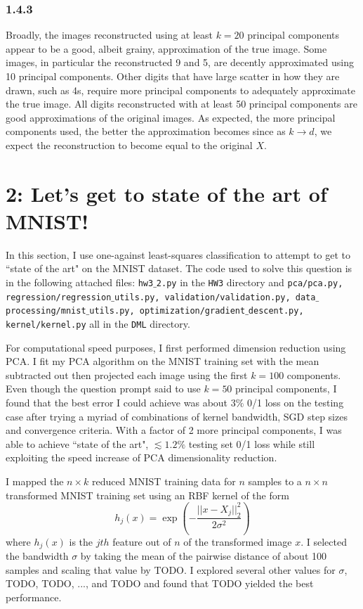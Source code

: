 \documentclass[12pt]{amsart}
\begin{document}
\subsubsection*{1.4.3}

Broadly, the images reconstructed using at least $k = 20$ principal components appear to be a good, albeit grainy, approximation of the true image.  Some images, in particular the reconstructed 9 and 5, are decently approximated using 10 principal components.  Other digits that have large scatter in how they are drawn, such as 4s, require more principal components to adequately approximate the true image.  All digits reconstructed with at least 50 principal components are good approximations of the original images.  As expected, the more principal components used, the better the approximation becomes since as $k \rightarrow d$, we expect the reconstruction to become equal to the original $X$.

\section*{2: Let's get to state of the art of MNIST!}

In this section, I use one-against least-squares classification to attempt to get to ``state of the art" on the MNIST dataset.  The code used to solve this question is in the following attached files: {\tt hw3$\_$2.py} in the {\tt HW3} directory and {\tt pca/pca.py, regression/regression$\_$utils.py, validation/validation.py, data$\_$processing/mnist$\_$utils.py, optimization/gradient$\_$descent.py, kernel/kernel.py} all in the {\tt DML} directory.

For computational speed purposes, I first performed dimension reduction using PCA.  I fit my PCA algorithm on the MNIST training set with the mean subtracted out then projected each image using the first $k = 100$ components.  Even though the question prompt said to use $k = 50$ principal components, I found that the best error I could achieve was about $3\%$ 0/1 loss on the testing case after trying a myriad of combinations of kernel bandwidth, SGD step sizes and convergence criteria.  With a factor of 2 more principal components, I was able to achieve ``state of the art", ${\lesssim}1.2\%$ testing set 0/1 loss while still exploiting the speed increase of PCA dimensionality reduction.

I mapped the $n \times k$ reduced MNIST training data for $n$ samples to a $n \times n$ transformed MNIST training set using an RBF kernel of the form
\begin{equation} \label{eqn:rbf_kernel}
h_j(x) = \exp \left( - \frac{||x - X_j ||^2_2}{2\sigma^2} \right)
\end{equation}
where $h_j(x)$ is the $jth$ feature out of $n$ of the transformed image $x$.  I selected the bandwidth $\sigma$ by taking the mean of the pairwise distance of about 100 samples and scaling that value by TODO.  I explored several other values for $\sigma$, TODO, TODO, ..., and TODO and found that TODO yielded the best performance.  
\end{document}
